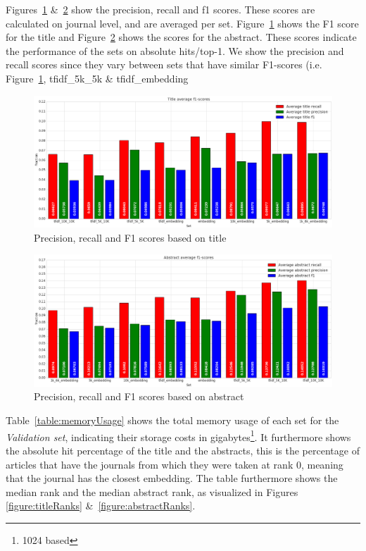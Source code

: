 \documentclass[../../Thesis.tex]{subfiles}
\begin{document}
\clearpage
{}
Figures~\ref{figure:f1Title} \&~\ref{figure:f1Abstract} show the precision, recall and f1 scores. These scores are calculated on journal level, and are averaged per set. Figure~\ref{figure:f1Title} shows the F1 score for the title and Figure~\ref{figure:f1Abstract} shows the scores for the abstract. These scores indicate the performance of the sets on absolute hits/top-1. We show the precision and recall scores since they vary between sets that have similar F1-scores (i.e. Figure~\ref{figure:f1Title}, tfidf\_5k\_5k \& tfidf\_embedding
\begin{figure}[hbt]
\includegraphics[width=6.5in]{Plots/Title_avg_f1}
\caption{Precision, recall and F1 scores based on title}\label{figure:f1Title}
\end{figure}
\begin{figure}[htb]
\includegraphics[width=6.5in]{Plots/Abstract_avg_f1}
\caption{Precision, recall and F1 scores based on abstract}\label{figure:f1Abstract}
\end{figure}
\clearpage
{}
Table~\ref{table:memoryUsage} shows the total memory usage of each set for the \textit{Validation set}, indicating their storage costs in gigabytes\footnote{1024 based}. It furthermore shows the absolute hit percentage of the title and the abstracts, this is the percentage of articles that have the journals from which they were taken at rank 0, meaning that the journal has the closest embedding. The table furthermore shows the median rank and the median abstract rank, as visualized in Figures \ref{figure:titleRanks} \&~\ref{figure:abstractRanks}.\\
\end{document}
